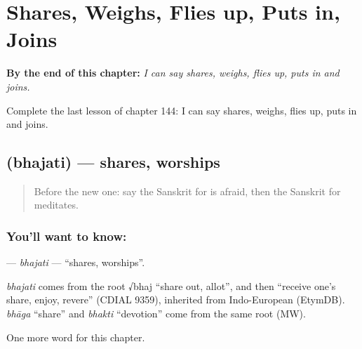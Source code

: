
\chapter{Shares, Weighs, Flies up, Puts in, Joins}
\label{ch:sa-shares-weighs-flies-up-puts-in-joins}

\begin{chapteropening}
\textbf{By the end of this chapter:} \emph{I can say shares, weighs, flies up, puts in and joins.}

Complete the last lesson of chapter 144: I can say shares, weighs, flies up, puts in and joins.
\end{chapteropening}

\section[\texorpdfstring{\sk{भजति} (bhajati)}{भजति (bhajati)}]{ (bhajati) — shares, worships}

\label{lesson:SA-C144-bhajati}



\begin{quote}
Before the new one: say the Sanskrit for is afraid, then the Sanskrit for meditates.
\end{quote}

\subsection*{You'll want to know: }
\textbf{} — \emph{bhajati} — \textquotedblleft{}shares, worships\textquotedblright{}.

\begin{cousinweb}
\emph{bhajati} comes from the root √bhaj \textquotedblleft{}share out, allot\textquotedblright{}, and then \textquotedblleft{}receive one's share, enjoy, revere\textquotedblright{} (CDIAL 9359), inherited from Indo-European (EtymDB). \emph{bhāga} \textquotedblleft{}share\textquotedblright{} and \emph{bhakti} \textquotedblleft{}devotion\textquotedblright{} come from the same root (MW).
\end{cousinweb}

\begin{grammarlens}[title={What you've built}]
One more word for this chapter.
\end{grammarlens}

